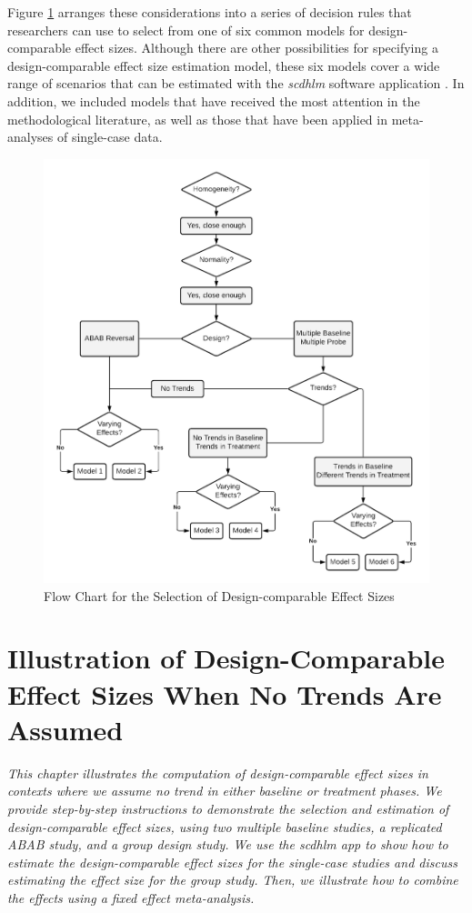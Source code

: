 \documentclass[
]{book}
\begin{document}
Figure \ref{fig:DC-ES-flow-chart} arranges these considerations into a series of decision rules that researchers can use to select from one of six common models for design-comparable effect sizes. Although there are other possibilities for specifying a design-comparable effect size estimation model, these six models cover a wide range of scenarios that can be estimated with the \emph{scdhlm} software application \citep{pustejovsky2021scdhlm}. In addition, we included models that have received the most attention in the methodological literature, as well as those that have been applied in meta-analyses of single-case data.

\begin{figure}
\includegraphics[width=0.75\linewidth]{images/DC-ES-flow-chart} \caption{Flow Chart for the Selection of Design-comparable Effect Sizes}\label{fig:DC-ES-flow-chart}
\end{figure}

\hypertarget{illustrate-D-CES}{%
\chapter{Illustration of Design-Comparable Effect Sizes When No Trends Are Assumed}\label{illustrate-D-CES}}

\emph{This chapter illustrates the computation of design-comparable effect sizes in contexts where we assume no trend in either baseline or treatment phases. We provide step-by-step instructions to demonstrate the selection and estimation of design-comparable effect sizes, using two multiple baseline studies, a replicated ABAB study, and a group design study. We use the \emph{scdhlm} app to show how to estimate the design-comparable effect sizes for the single-case studies and discuss estimating the effect size for the group study. Then, we illustrate how to combine the effects using a fixed effect meta-analysis.}
\end{document}
